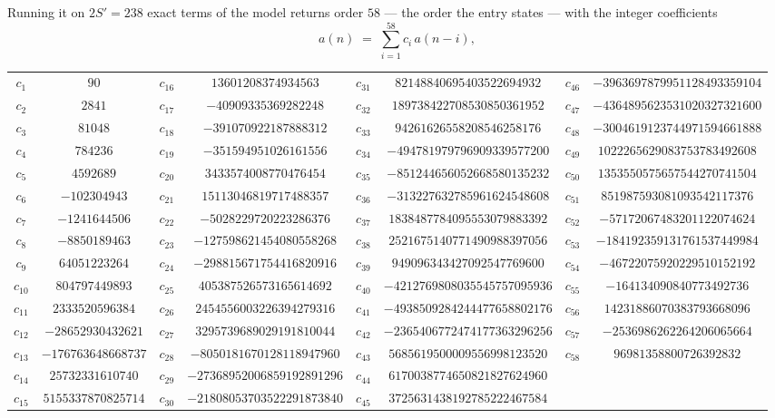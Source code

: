 \documentclass[11pt,a4paper]{article}
\theoremstyle{plain}
\theoremstyle{definition}
\begin{document}
Running it on $2S'=238$ exact terms of the model returns order $58$ --- the order the
entry states --- with the integer coefficients
\[
a(n)\;=\;\sum_{i=1}^{58}c_i\,a(n-i),
\]
\begin{center}\small
\begin{tabular}{cccccccc}
$c_{1}$ & $90$ & $c_{16}$ & $13601208374934563$ & $c_{31}$ & $82148840695403522694932$ & $c_{46}$ & $-3963697879951128493359104$ \\
$c_{2}$ & $2841$ & $c_{17}$ & $-40909335369282248$ & $c_{32}$ & $189738422708530850361952$ & $c_{47}$ & $-4364895623531020327321600$ \\
$c_{3}$ & $81048$ & $c_{18}$ & $-391070922187888312$ & $c_{33}$ & $94261626558208546258176$ & $c_{48}$ & $-3004619123744971594661888$ \\
$c_{4}$ & $784236$ & $c_{19}$ & $-351594951026161556$ & $c_{34}$ & $-494781979796909339577200$ & $c_{49}$ & $1022265629083753783492608$ \\
$c_{5}$ & $4592689$ & $c_{20}$ & $3433574008770476454$ & $c_{35}$ & $-851244656052668580135232$ & $c_{50}$ & $1353550575657544270741504$ \\
$c_{6}$ & $-102304943$ & $c_{21}$ & $15113046819717488357$ & $c_{36}$ & $-313227632785961624548608$ & $c_{51}$ & $851987593081093542117376$ \\
$c_{7}$ & $-1241644506$ & $c_{22}$ & $-5028229720223286376$ & $c_{37}$ & $1838487784095553079883392$ & $c_{52}$ & $-57172067483201122074624$ \\
$c_{8}$ & $-8850189463$ & $c_{23}$ & $-127598621454080558268$ & $c_{38}$ & $2521675140771490988397056$ & $c_{53}$ & $-184192359131761537449984$ \\
$c_{9}$ & $64051223264$ & $c_{24}$ & $-298815671754416820916$ & $c_{39}$ & $949096343427092547769600$ & $c_{54}$ & $-46722075920229510152192$ \\
$c_{10}$ & $804797449893$ & $c_{25}$ & $405387526573165614692$ & $c_{40}$ & $-4212769808035545757095936$ & $c_{55}$ & $-164134090840773492736$ \\
$c_{11}$ & $2333520596384$ & $c_{26}$ & $2454556003226394279316$ & $c_{41}$ & $-4938509284244477658802176$ & $c_{56}$ & $14231886070383793668096$ \\
$c_{12}$ & $-28652930432621$ & $c_{27}$ & $3295739689029191810044$ & $c_{42}$ & $-2365406772474177363296256$ & $c_{57}$ & $-2536986262264206065664$ \\
$c_{13}$ & $-176763648668737$ & $c_{28}$ & $-8050181670128118947960$ & $c_{43}$ & $5685619500009556998123520$ & $c_{58}$ & $96981358800726392832$ \\
$c_{14}$ & $25732331610740$ & $c_{29}$ & $-27368952006859192891296$ & $c_{44}$ & $6170038774650821827624960$ &  &  \\
$c_{15}$ & $5155337870825714$ & $c_{30}$ & $-21808053703522291873840$ & $c_{45}$ & $3725631438192785222467584$ &  &  \\
\end{tabular}
\end{center}
\end{document}
